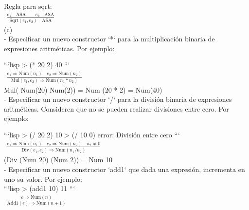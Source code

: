\documentclass[14pt]{article}
\begin{document}
\begin{enumerate}
Regla para sqrt:\\
$\begin{gathered} \frac{e_1 \quad\text{ASA} \quad\quad e_2 \quad\text{ASA}}{\text{Sqrt}(e_1, e_2)\quad \text{ASA}} \end{gathered}$\\
          

(c)\\
   - Especificar un nuevo constructor `*` para la multiplicación binaria de expresiones aritméticas. Por ejemplo:
     
      ```lisp
      > (* 20 2)
      40
      ``` \\

      $\begin{gathered} \frac{e_1 \Rightarrow \text{Num}(n_1) \quad e_2 \Rightarrow \text{Num}(n_2)}{\text{Mul}(e_1, e_2) \Rightarrow \text{Num}(n_1 * n_2)} \end{gathered}$\\

    Mul( Num(20) Num(2)) = Num (20 * 2) = Num(40)\\
    
   - Especificar un nuevo constructor `/` para la división binaria de expresiones aritméticas. Consideren que no se pueden realizar divisiones entre cero. Por ejemplo: 
     
      ```lisp
      > (/ 20 2)
      10
      > (/ 10 0)
      error: División entre cero
      ``` \\
      
      $\begin{gathered} \frac{e_1 \Rightarrow \text{Num}(n_1) \quad e_2 \Rightarrow \text{Num}(n_2) \quad n_2 \neq 0}{\text{Div}(e_1, e_2) \Rightarrow \text{Num}(n_1 / n_2)} 
      \end{gathered}$\\

      (Div (Num 20) (Num 2)) = Num 10\\
      
   - Especificar un nuevo constructor `add1` que dada una expresión, incrementa en uno su valor. Por ejemplo:\\
     
      ```lisp
      > (add1 10)
      11
      ``` \\

      $\begin{gathered} \frac{e \Rightarrow \text{Num}(n)}{\text{Add1}(e) \Rightarrow \text{Num}(n + 1)} \end{gathered}$\\


\end{enumerate}
\end{document}
